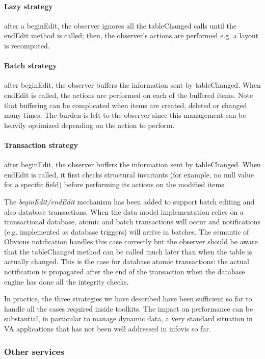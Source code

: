 \paragraph{Lazy strategy} after a beginEdit, the observer ignores all the
  tableChanged calls until the endEdit method is called; then, the
  observer's actions are performed e.g. a layout is recomputed.

\paragraph{Batch strategy} after beginEdit, the observer buffers the
  information sent by tableChanged.  When endEdit is called, the
  actions are performed on each of the buffered items.  Note that 
  buffering can be complicated when items are created, deleted or
  changed many times.  The burden is left to the observer since this
  management can be heavily optimized depending on the action to
  perform.

\paragraph{Transaction strategy} after beginEdit, the observer buffers the
  information sent by tableChanged.  When endEdit is called, it first
  checks structural invariants (for example, no null value for a
  specific field) before performing its actions on the modified items.

The \emph{beginEdit/endEdit} mechanism has been added to support batch
editing and also database transactions.  When the data model
implementation relies on a transactional database, atomic and batch
transactions will occur and notifications (e.g. implemented as
database triggers) will arrive in batches.  The semantic of Obvious
notification handles this case correctly but the observer should be
aware that the tableChanged method can be called much later than when
the table is actually changed.  This is the case for database atomic
transactions: the actual notification is propagated after the end of
the transaction when the database engine has done all the integrity
checks.

In practice, the three strategies we have described have been
sufficient so far to handle all the cases required inside toolkits.
The impact on performance can be substantial, in particular to manage
dynamic data, a very standard situation in VA
applications that has not been well addressed in infovis so far.


\subsubsection{Other services}

